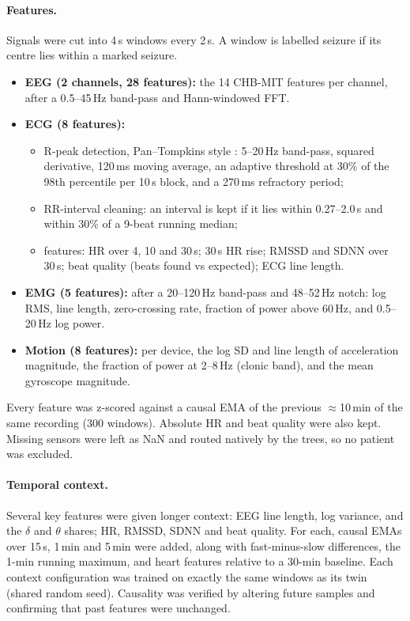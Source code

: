 \paragraph{Features.} Signals were cut into 4\,s windows every 2\,s. A window is labelled seizure if its centre lies within a marked seizure.
\begin{itemize}
\item \textbf{EEG (2 channels, 28 features):} the 14 CHB-MIT features per channel, after a 0.5--45\,Hz band-pass and Hann-windowed FFT.
\item \textbf{ECG (8 features):}
\begin{itemize}
\item R-peak detection, Pan--Tompkins style \cite{pan1985}: 5--20\,Hz band-pass, squared derivative, 120\,ms moving average, an adaptive threshold at 30\% of the 98th percentile per 10\,s block, and a 270\,ms refractory period;
\item RR-interval cleaning: an interval is kept if it lies within 0.27--2.0\,s and within 30\% of a 9-beat running median;
\item features: HR over 4, 10 and 30\,s; 30\,s HR rise; RMSSD and SDNN over 30\,s; beat quality (beats found vs expected); ECG line length.
\end{itemize}
\item \textbf{EMG (5 features):} after a 20--120\,Hz band-pass and 48--52\,Hz notch: log RMS, line length, zero-crossing rate, fraction of power above 60\,Hz, and 0.5--20\,Hz log power.
\item \textbf{Motion (8 features):} per device, the log SD and line length of acceleration magnitude, the fraction of power at 2--8\,Hz (clonic band), and the mean gyroscope magnitude.
\end{itemize}
Every feature was z-scored against a causal EMA of the previous $\approx$10\,min of the same recording (300 windows). Absolute HR and beat quality were also kept. Missing sensors were left as NaN and routed natively by the trees, so no patient was excluded.

\paragraph{Temporal context.} Several key features were given longer context: EEG line length, log variance, and the $\delta$ and $\theta$ shares; HR, RMSSD, SDNN and beat quality. For each, causal EMAs over 15\,s, 1\,min and 5\,min were added, along with fast-minus-slow differences, the 1-min running maximum, and heart features relative to a 30-min baseline. Each context configuration was trained on exactly the same windows as its twin (shared random seed). Causality was verified by altering future samples and confirming that past features were unchanged.

